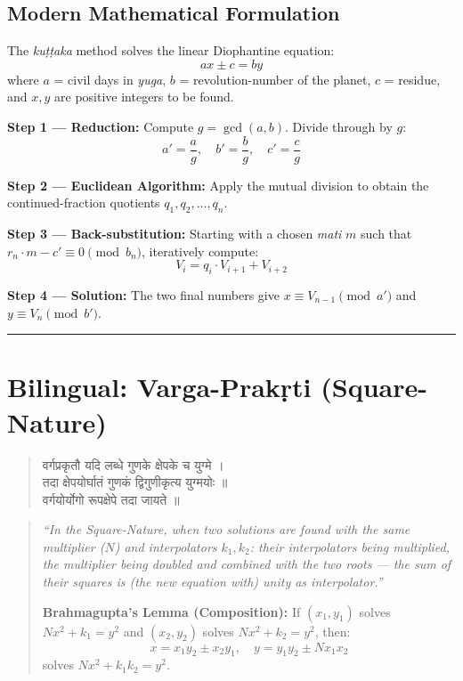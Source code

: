 \documentclass[11pt,a4paper]{article}
\newcommand{\longline}{\noindent\rule{\textwidth}{0.4pt}}
\newcommand{\dev}[1]{{\devanagarifont #1}}
\theoremstyle{definition}
\begin{document}
\subsection*{Modern Mathematical Formulation}

The \textit{ku\d{t}\d{t}aka} method solves the linear Diophantine equation:
\[
ax \pm c = by
\]
where $a$ = civil days in \textit{yuga}, $b$ = revolution-number of the planet, $c$ = residue, and $x, y$ are positive integers to be found.

\textbf{Step 1 --- Reduction:} Compute $g = \gcd(a,b)$. Divide through by $g$:
\[
a' = \frac{a}{g}, \quad b' = \frac{b}{g}, \quad c' = \frac{c}{g}
\]

\textbf{Step 2 --- Euclidean Algorithm:} Apply the mutual division to obtain the continued-fraction quotients $q_1, q_2, \ldots, q_n$.

\textbf{Step 3 --- Back-substitution:} Starting with a chosen \textit{mati} $m$ such that $r_n \cdot m - c' \equiv 0 \pmod{b_n}$, iteratively compute:
\[
V_i = q_i \cdot V_{i+1} + V_{i+2}
\]

\textbf{Step 4 --- Solution:} The two final numbers give $x \equiv V_{n-1} \pmod{a'}$ and $y \equiv V_n \pmod{b'}$.

\longline

\section*{Bilingual: Varga-Prak\d{r}ti (Square-Nature)}



\noindent
\begin{quote}
\dev{वर्गप्रकृतौ यदि लब्धे गुणके क्षेपके च युग्मे ।\\
तदा क्षेपयोर्घातं गुणकं द्विगुणीकृत्य युग्मयोः ॥}\\[0.3cm]
\dev{वर्गयोर्योगो रूपक्षेपे तदा जायते ॥}
\end{quote}

\hfill\noindent
\begin{quote}
\textit{``In the Square-Nature, when two solutions are found with the same multiplier ($N$) and interpolators $k_1, k_2$: their interpolators being multiplied, the multiplier being doubled and combined with the two roots --- the sum of their squares is (the new equation with) unity as interpolator.''}

\textbf{Brahmagupta's Lemma (Composition):} If $(x_1, y_1)$ solves $Nx^2 + k_1 = y^2$ and $(x_2, y_2)$ solves $Nx^2 + k_2 = y^2$, then:
\[x = x_1 y_2 \pm x_2 y_1, \quad y = y_1 y_2 \pm N x_1 x_2\]
solves $Nx^2 + k_1 k_2 = y^2$.
\end{quote}
\end{document}
